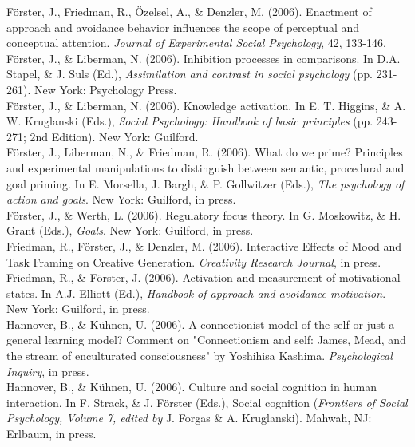 F\"{o}rster, J., Friedman, R., \"{O}zelsel, A., \& Denzler, M. (2006). Enactment of approach and avoidance behavior influences the scope of perceptual and conceptual attention. \textit{Journal of Experimental Social Psychology}, 42, 133-146.\\ 

F\"{o}rster, J., \& Liberman, N. (2006). Inhibition processes in comparisons. In D.A. Stapel, \& J. Suls (Ed.), \textit{Assimilation and contrast in social psychology}  (pp. 231-261). New York: Psychology Press. \\ 

F\"{o}rster, J., \& Liberman, N. (2006). Knowledge activation. In E. T. Higgins, \& A. W. Kruglanski (Eds.),\textit{ Social Psychology: Handbook of basic principles} (pp. 243-271; 2nd Edition). New York: Guilford.\\ 

F\"{o}rster, J., Liberman, N., \& Friedman, R. (2006). What do we prime? Principles and experimental manipulations to distinguish between semantic, procedural and goal priming. In E. Morsella, J. Bargh, \& P. Gollwitzer (Eds.), \textit{The psychology of action and goals}. New York: Guilford, in press.\\ 

F\"{o}rster, J., \& Werth, L. (2006). Regulatory focus theory. In G. Moskowitz, \& H. Grant (Eds.), \textit{Goals}. New York: Guilford, in press.\\ 

Friedman, R., F\"{o}rster, J., \& Denzler, M. (2006). Interactive Effects of Mood and Task Framing on Creative Generation. \textit{Creativity Research Journal}, in press.\\ 

Friedman, R., \& F\"{o}rster, J. (2006). Activation and measurement of motivational states. In A.J. Elliott (Ed.), \textit{Handbook of approach and avoidance motivation}. New York: Guilford, in press.\\ 

Hannover, B., \& K\"{u}hnen, U. (2006). A connectionist model of the self or just a general learning model? Comment on "Connectionism and self: James, Mead, and the stream of enculturated consciousness" by Yoshihisa Kashima. \textit{Psychological Inquiry}, in press.\\ 

Hannover, B., \& K\"{u}hnen, U. (2006). Culture and social cognition in human interaction. In F. Strack, \& J. F\"{o}rster (Eds.), Social cognition (\textit{Frontiers of Social Psychology, Volume 7, edited by} J. Forgas \& A. Kruglanski). Mahwah, NJ: Erlbaum, in press.\\ 

